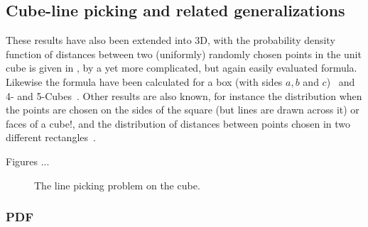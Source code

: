 \subsection{Cube-line picking and related generalizations}
\label{sec:cube_line}

These results have also been extended into 3D, with the probability
density function of distances between two (uniformly) randomly chosen
points in the unit cube is given in
\cite{mathai99:_distan,weisstein:_cube_line_picking}, by a yet more
complicated, but again easily evaluated formula. Likewise the formula
have been calculated for a box (with sides $a,b$ and
$c$)~\cite{philip:_probab_distr_distan_between_two} and 4- and
5-Cubes~\cite{philip:_probab_distr_distan_between_two_4d}. Other
results are also known, for instance the distribution when the points
are chosen on the sides of the square (but lines are drawn across it)
or faces of a cube!\cite{mathai99:_distan}, and the distribution of
distances between points chosen in two different
rectangles~\cite{b.ghosh51:_random_rect}.

Figures ...

\begin{figure}[tbp]
  \begin{center}
    \hspace{3mm}
    \subfloat[\label{fig:cube_pdf}The PDF for $a=1$, $b=2.5$,
    showing the three
    regions.]{}
    \caption{The line picking problem on the cube.}
  \end{center} 
\vspace{-4mm}
\end{figure}

\subsubsection{PDF}

